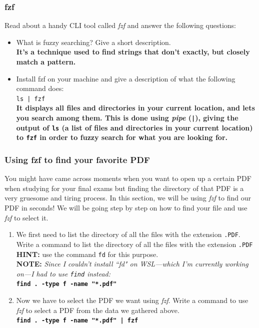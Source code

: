 \documentclass[titlepage, 12pt]{article}
\newcommand{\code}{\texttt}
\begin{document}
	\subsubsection{fzf}
	Read about a handy CLI tool called \textit{fzf} and answer the following questions:
	\begin{itemize}
		\item What is fuzzy searching? Give a short description.
		\\
		\textbf{It's a technique used to find strings that don't exactly, but closely match a pattern.}
		\item Install fzf on your machine and give a description of what the following command does:
		\\
		\code{ls | fzf}
		\\
		\textbf{It displays all files and directories in your current location, and lets you search among them. This is done using \textit{pipe} (\code{|}), giving the output of \code{ls} (a list of files and directories in your current location) to \code{fzf} in order to fuzzy search for what you are looking for.}
	\end{itemize}
	
	\subsubsection{Using fzf to find your favorite PDF}
	You might have came across moments when you want to open up a certain PDF when studying for your final exams but finding the directory of that PDF is a very gruesome and tiring process. In this section, we will be using \textit{fzf} to find our PDF in seconds! We will be going step by step on how to find your file and use \textit{fzf} to select it.
	\begin{enumerate}
		\item We first need to list the directory of all the files with the extension \code{.PDF}. Write a
		command to list the directory of all the files with the extension \code{.PDF}
		\\
		\textbf{HINT:} use the command \code{fd} for this purpose.
		\\
		\textbf{NOTE: }\textit{Since I couldn't install ``fd" on WSL---which I'm currently working on---I had to use \code{find} instead:}
		\\
		\textbf{\code{find . -type f -name "*.pdf"}}
		\item Now we have to select the PDF we want using \textit{fzf}. Write a command to use \textit{fzf} to select a PDF from the data we gathered above.
		\\
		\textbf{\code{find . -type f -name "*.pdf" | fzf}}
	\end{enumerate}
	
\end{document}
